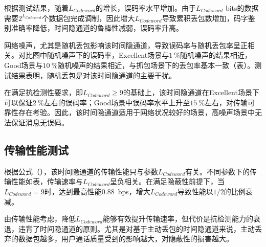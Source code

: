 根据测试结果，随着$L_{Codeword}$的增长，误码率水平增加。由于$L_{Codeword}$ bits的数据需要$2^{L_{Codeword}}$个数据包完成调制，因此增大$L_{Codeword}$导致累积丢包数增加，码字鉴别准确率降低，时间隐通道的鲁棒性减弱，误码率升高。

网络噪声，尤其是随机丢包影响该时间隐通道，导致误码率与随机丢包率呈正相关。对比图中随机噪声下的误码率，Excellent场景与{$1\ \%$}随机噪声的结果相近，Good场景与{$10\ \%$}随机噪声的结果相近，与抓包场景下的丢包率基本一致（表）。测试结果表明，随机丢包是对该时间隐通道的主要干扰。

在满足抗检测性要求，即$L_{Codeword}\ge 9$的基础上，该时间隐通道在Excellent场景下可以保证{$2\ \%$}左右的误码率；Good场景中误码率水平上升至{$15\ \%$}左右，对传输可靠性存在考验。因此，该时间隐通道适用于网络状况较好的场景，高噪声场景中无法保证消息无误码。

\subsection{传输性能测试}
\label{chap:zigzag:results:throughput}


根据公式（），该时间隐通道的传输性能只与参数$L_{Codeword}$有关。不同参数下的传输性能如表，传输速率与$L_{Codeword}$呈负相关。在满足隐蔽性前提下，当$L_{Codeword}=9$时，达到最高性能{0.88\ bps}，增大$L_{Codeword}$导致性能以$1/2$的比例衰减。

由传输性能考虑，降低$L_{Codeword}$能够有效提升传输速率，但代价是抗检测能力的衰退，违背了时间隐通道的原则。尤其是对基于主动丢包的时间隐通道来说，主动丢弃的数据包越多，用户通话质量受到的影响越大，对隐蔽性的损害越大。

